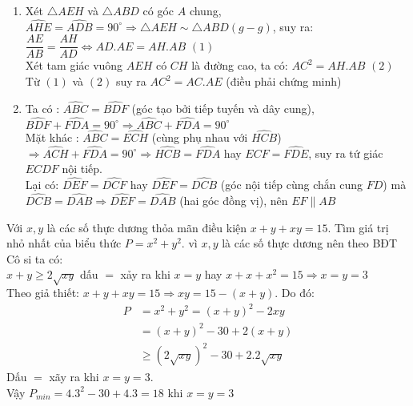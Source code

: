 \begin{ex}
{\begin{enumerate}
        Xét tứ giác $BDEH$ có $\widehat{EDB}+\widehat{EHB}=180^\circ$ nên nội tiếp được đường tròn.
       \item Xét $\triangle AEH$ và $\triangle ABD$ có góc $A$ chung, $\widehat{AHE}=\widehat{ADB}=90^\circ\Rightarrow \triangle AEH\sim \triangle ABD(g-g)$, suy ra: $\dfrac{AE}{AB}=\dfrac{AH}{AD}\Leftrightarrow AD.AE=AH.AB$ $(1)$\\
       Xét tam giác vuông $AEH$ có $CH$ là đường cao, ta có: $AC^2=AH.AB$ $(2)$\\
       Từ $(1)$ và $(2)$ suy ra $AC^2=AC.AE$ (điều phải chứng minh)
       \item Ta có : $\widehat{ABC}=\widehat{BDF}$ (góc tạo bởi tiếp tuyến và dây cung), $\widehat{BDF}+\widehat{FDA}=90^\circ\Rightarrow \widehat{ABC}+\widehat{FDA}=90^\circ$\\
       Mặt khác : $\widehat{ABC}=\widehat{ECH}$ (cùng phụ nhau với $\widehat{HCB}$) $\Rightarrow \widehat{ACH}+\widehat{FDA}=90^\circ\Rightarrow \widehat{HCB}=\widehat{FDA}$ hay $\widehat{ECF}=\widehat{FDE}$, suy ra tứ giác $ECDF$ nội tiếp.\\
       Lại có: $\widehat{DEF}=\widehat{DCF}$ hay $\widehat{DEF}=\widehat{DCB}$ (góc nội tiếp cùng chắn cung $FD$) mà $\widehat{DCB}=\widehat{DAB}\Rightarrow \widehat{DEF}=\widehat{DAB}$ (hai góc đồng vị), nên $EF\parallel AB$
      \end{enumerate}
    }
\end{ex}

\begin{ex}%
    Với $x,y$ là các số thực dương thỏa mãn điều kiện $x+y+xy=15$. Tìm giá trị nhỏ nhất của biểu thức  $P=x^2+y^2$.
\loigiai
    {
    vì $x,y$ là các số thực dương nên theo BĐT Cô si ta có: \\
    $x+y\geq 2\sqrt{xy}$ dấu $=$ xảy ra khi $x=y$ hay $x+x+x^2=15\Rightarrow x=y=3$\\
    Theo giả thiết: $x+y+xy=15\Rightarrow xy=15-(x+y)$. Do đó: 
    \begin{align*}
    P&=x^2+y^2=(x+y)^2-2xy\\
    &=(x+y)^2-30+2(x+y)\\
    &\geq (2\sqrt{xy})^2-30+2.2\sqrt{xy}
    \end{align*}
    Dấu $=$ xãy ra khi $x=y=3$.\\
    Vậy $P_{min}=4.3^2-30+4.3=18$ khi $x=y=3$
   }
\end{ex}

